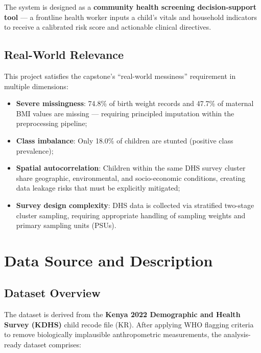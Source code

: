 \documentclass[12pt, a4paper]{article}
\begin{document}
The system is designed as a \textbf{community health screening decision-support tool} — a frontline health worker inputs a child's vitals and household indicators to receive a calibrated risk score and actionable clinical directives.

\subsection{Real-World Relevance}

This project satisfies the capstone's ``real-world messiness'' requirement in multiple dimensions:

\begin{itemize}
    \item \textbf{Severe missingness}: 74.8\% of birth weight records and 47.7\% of maternal BMI values are missing — requiring principled imputation within the preprocessing pipeline;
    \item \textbf{Class imbalance}: Only 18.0\% of children are stunted (positive class prevalence);
    \item \textbf{Spatial autocorrelation}: Children within the same DHS survey cluster share geographic, environmental, and socio-economic conditions, creating data leakage risks that must be explicitly mitigated;
    \item \textbf{Survey design complexity}: DHS data is collected via stratified two-stage cluster sampling, requiring appropriate handling of sampling weights and primary sampling units (PSUs).
\end{itemize}


\section{Data Source and Description}

\subsection{Dataset Overview}

The dataset is derived from the \textbf{Kenya 2022 Demographic and Health Survey (KDHS)} child recode file (KR). After applying WHO flagging criteria to remove biologically implausible anthropometric measurements, the analysis-ready dataset comprises:
\end{document}
